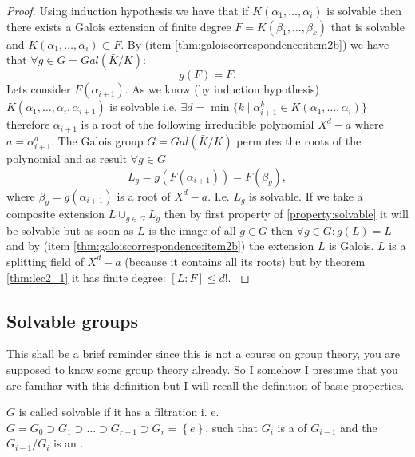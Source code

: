 \begin{property}
\begin{proof}
{      Using induction hypothesis we have that if
      $K\left(\alpha_1, \dots, \alpha_i\right)$ is solvable then there
      exists a Galois extension of finite degree
      $F = K\left(\beta_1, \dots, \beta_k \right)$ that is solvable
      and $K\left(\alpha_1, \dots, \alpha_i\right) \subset F$.
      By  (item
      \ref{thm:galoiscorrespondence:item2b}) we have that
      $\forall g \in G = Gal\left(\bar{K}/K\right)$:
      \[
      g\left(F\right) = F.
      \]
      Lets consider $F\left(\alpha_{i+1}\right)$. As we know
      (by induction hypothesis)
      $K\left(\alpha_1, \dots, \alpha_i, \alpha_{i+1}\right)$ is
      solvable i.e.
      \(
      \exists d = \min\{k \mid \alpha_{i+1}^k
      \in K\left(\alpha_1, \dots, \alpha_i\right)\}
      \)
      therefore $\alpha_{i+1}$ is a root of the following irreducible
      polynomial $X^d - a$ where $a = \alpha_{i+1}^d$.
      The Galois group $G = Gal\left(\bar{K}/K\right)$ permutes the
      roots of the polynomial and as result $\forall g \in G$
      \[
      L_g = g\left(F\left(\alpha_{i+1}\right)\right) =
      F\left(\beta_g\right),
      \]
      where $\beta_g = g\left(\alpha_{i+1}\right)$ is a root of $X^d -
      a$. I.e. $L_g$ is solvable. If we take a composite extension
      $L \cup_{g \in G} L_g$ then by first property of
      \ref{property:solvable} it will be solvable but as soon as
      $L$ is the image of all $g \in G$ then
      $\forall g \in G: g\left(L\right) = L$ and by
       (item
      \ref{thm:galoiscorrespondence:item2b})  the extension $L$ is
      Galois. $L$ is a splitting field of $X^d - a$ (because it
      contains all its roots) but by theorem \ref{thm:lec2_1} it has
      finite degree: $\left[L : F\right] \le d!$.
    }
  \end{proof}
\end{property}

\subsection{Solvable groups}
This shall be a brief reminder since this is not a course on group
theory, you are supposed to know some group theory already. So I
somehow I presume that you are familiar with this definition but I
will recall the definition of basic properties.

\begin{definition}
  $G$ is called solvable if it has a filtration 
  i. e. $G = G_0 \supset G_1 \supset \dots \supset G_{r-1} \supset G_r
  = \left\{e\right\}$, such that $G_i$ is a
   of 
  $G_{i-1}$ and the  $G_{i-1}/G_i$ is
  an .
  \label{def:solvablegroup}
\end{definition}

